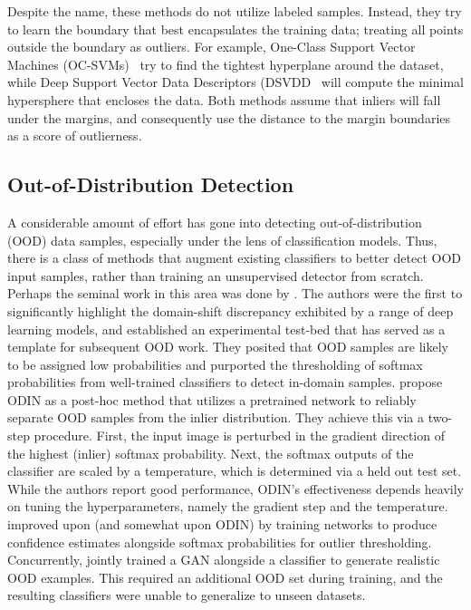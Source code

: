 Despite the name, these methods do not utilize labeled samples. Instead, they try to learn the boundary that best encapsulates the training data; treating all points outside the boundary as outliers. For example, One-Class Support Vector Machines (OC-SVMs)~\cite{ocsvm} try to find the tightest hyperplane around the dataset, while Deep Support Vector Data Descriptors (DSVDD~\cite{pmlr-v80-ruff18a}  will compute the minimal hypersphere that encloses the data. Both methods assume that inliers will fall under the margins, and consequently use the distance to the margin boundaries as a score of outlierness. 

\subsection{Out-of-Distribution Detection}
A considerable amount of effort has gone into detecting out-of-distribution (OOD) data samples, especially under the lens of classification models. Thus, there is a class of methods that augment existing classifiers to better detect OOD input samples, rather than training an unsupervised detector from scratch. Perhaps the seminal work in this area was done by \citet{Hendrycks2019}. The authors were the first to significantly highlight the domain-shift discrepancy exhibited by a range of deep learning models, and established an experimental test-bed that has served as a template for subsequent OOD work. They posited that OOD samples are likely to be assigned low probabilities and purported the thresholding of softmax probabilities from well-trained classifiers to detect in-domain samples. \cite{Liang2017} propose ODIN as a post-hoc method that utilizes a pretrained network to reliably separate OOD samples from the inlier distribution. They achieve this via a two-step procedure. First, the input image is perturbed in the gradient direction of the highest (inlier) softmax probability. Next, the softmax outputs of the classifier are scaled by a temperature, which is determined via a held out test set. While the authors report good performance, ODIN's effectiveness depends heavily on tuning the hyperparameters, namely the gradient step and the temperature. \cite{devries2018learning} improved upon \cite{Hendrycks2019} (and somewhat upon ODIN) by training networks to produce confidence estimates alongside softmax probabilities for outlier thresholding. Concurrently, \cite{Lee2018} jointly trained a GAN alongside a classifier to generate realistic OOD examples. This required an additional OOD set during training, and the resulting classifiers were unable to generalize to unseen datasets.


